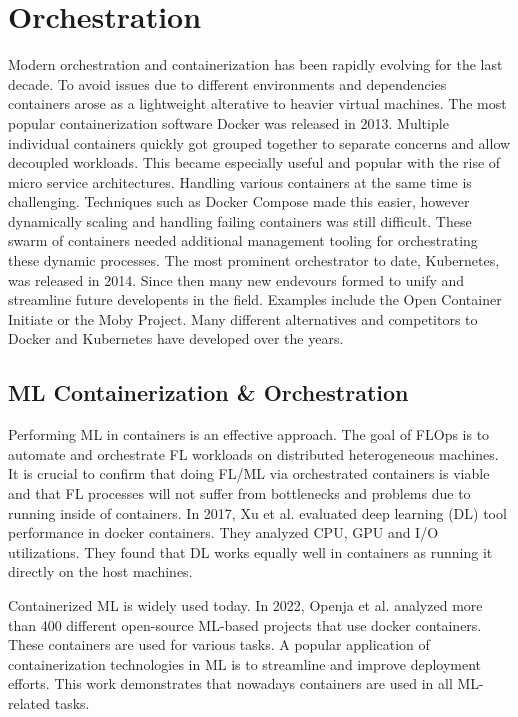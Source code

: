 \section{Orchestration}

Modern orchestration and containerization has been rapidly evolving for the last decade.
To avoid issues due to different environments and dependencies containers arose as a lightweight alterative to heavier virtual machines.
The most popular containerization software Docker was released in 2013.
Multiple individual containers quickly got grouped together to separate concerns and allow decoupled workloads.
This became especially useful and popular with the rise of micro service architectures.
Handling various containers at the same time is challenging.
Techniques such as Docker Compose made this easier, however dynamically scaling and handling failing containers was still difficult.
These swarm of containers needed additional management tooling for orchestrating these dynamic processes.
The most prominent orchestrator to date, Kubernetes, was released in 2014.
Since then many new endevours formed to unify and streamline future developents in the field.
Examples include the Open Container Initiate or the Moby Project.
Many different alternatives and competitors to Docker and Kubernetes have developed over the years.

\subsection{ML Containerization \& Orchestration}

Performing ML in containers is an effective approach.
The goal of FLOps is to automate and orchestrate FL workloads on distributed heterogeneous machines.
It is crucial to confirm that doing FL/ML via orchestrated containers is viable and that FL processes will not suffer from bottlenecks and problems due to running inside of containers.
In 2017, Xu et al. \cite{paper:dl_via_docker} evaluated deep learning (DL) tool performance in docker containers.
They analyzed CPU, GPU and I/O utilizations.
They found that DL works equally well in containers as running it directly on the host machines.

Containerized ML is widely used today.
In 2022, Openja et al. \cite{paper:ml_practices_on_docker} analyzed more than 400 different open-source ML-based projects that use docker containers.
These containers are used for various tasks.
A popular application of containerization technologies in ML is to streamline and improve deployment efforts.
This work demonstrates that nowadays containers are used in all ML-related tasks.

